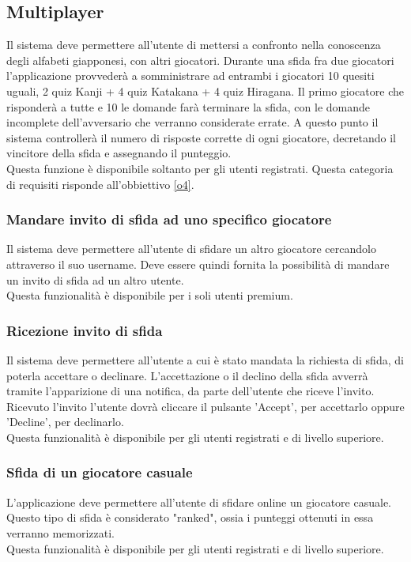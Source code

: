 \subsection{Multiplayer} \label{req_multiplayer}
Il sistema deve permettere all'utente di mettersi a confronto nella conoscenza degli alfabeti giapponesi, con altri giocatori. Durante una sfida fra due giocatori l'applicazione provvederà a somministrare ad entrambi i giocatori 10 quesiti uguali, 2 quiz Kanji + 4 quiz Katakana + 4 quiz Hiragana. Il primo giocatore che risponderà a tutte e 10 le domande farà terminare la sfida, con le domande incomplete dell'avversario che verranno considerate errate. A questo punto il sistema controllerà il numero di risposte corrette di ogni giocatore, decretando il vincitore della sfida e assegnando il punteggio. \\
Questa funzione è disponibile soltanto per gli utenti registrati. Questa categoria di requisiti risponde all'obbiettivo \ref{o4}.

\subsubsection{Mandare invito di sfida ad uno specifico giocatore} \label{req_invia_invito_sfida}
 Il sistema deve permettere all'utente di sfidare un altro giocatore cercandolo attraverso il suo username. Deve essere quindi fornita la possibilità di mandare un invito di sfida ad un altro utente. \\
 Questa funzionalità è disponibile per i soli utenti premium. 
 
 \subsubsection{Ricezione invito di sfida} \label{req_accetazione_invito_sfida}
 Il sistema deve permettere all'utente a cui è stato mandata la richiesta di sfida, di poterla accettare o declinare. L'accettazione o il declino della sfida avverrà tramite l'apparizione di una notifica, da parte dell'utente che riceve l'invito. Ricevuto l'invito l'utente dovrà cliccare il pulsante 'Accept', per accettarlo oppure 'Decline', per declinarlo. \\
 Questa funzionalità è disponibile per gli utenti registrati e di livello superiore.
 
 \subsubsection{Sfida di un giocatore casuale} \label{req_sfida_giocatore_casuale}
 L'applicazione deve permettere all'utente di sfidare online un giocatore casuale. Questo tipo di sfida è considerato "ranked", ossia i punteggi ottenuti in essa verranno memorizzati. \\
 Questa funzionalità è disponibile per gli utenti registrati e di livello superiore.
 
